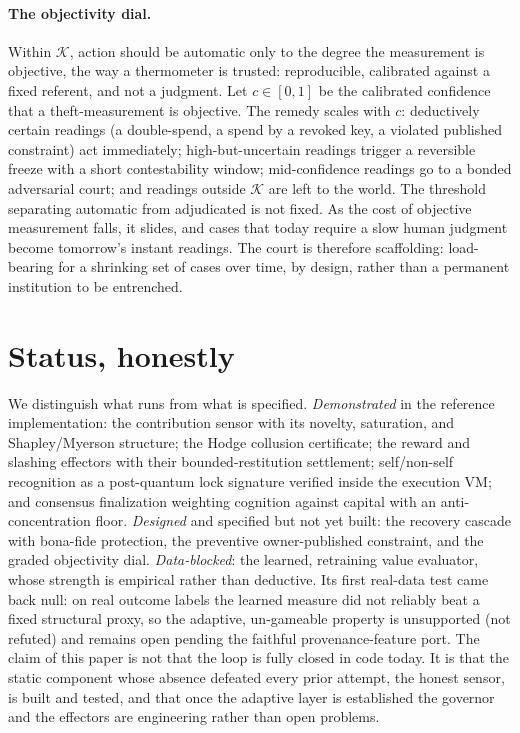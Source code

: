 \documentclass[10pt]{article}
\begin{document}
\paragraph{The objectivity dial.} Within $\mathcal{K}$, action should be automatic only to the degree the
measurement is objective, the way a thermometer is trusted: reproducible, calibrated against a fixed
referent, and not a judgment. Let $c \in [0,1]$ be the calibrated confidence that a theft-measurement is
objective. The remedy scales with $c$: deductively certain readings (a double-spend, a spend by a revoked
key, a violated published constraint) act immediately; high-but-uncertain readings trigger a reversible
freeze with a short contestability window; mid-confidence readings go to a bonded adversarial court; and
readings outside $\mathcal{K}$ are left to the world. The threshold separating automatic from adjudicated
is not fixed. As the cost of objective measurement falls, it slides, and cases that today require a slow
human judgment become tomorrow's instant readings. The court is therefore scaffolding: load-bearing for a
shrinking set of cases over time, by design, rather than a permanent institution to be entrenched.

\section{Status, honestly}

We distinguish what runs from what is specified. \emph{Demonstrated} in the reference implementation: the
contribution sensor with its novelty, saturation, and Shapley/Myerson structure; the Hodge collusion
certificate; the reward and slashing effectors with their bounded-restitution settlement; self/non-self
recognition as a post-quantum lock signature verified inside the execution VM; and consensus finalization
weighting cognition against capital with an anti-concentration floor. \emph{Designed} and specified but
not yet built: the recovery cascade with bona-fide protection, the preventive owner-published constraint,
and the graded objectivity dial. \emph{Data-blocked}: the learned, retraining value evaluator, whose strength is empirical rather than
deductive. Its first real-data test came back null: on real outcome labels the learned measure did not
reliably beat a fixed structural proxy, so the adaptive, un-gameable property is unsupported (not
refuted) and remains open pending the faithful provenance-feature port. The claim of this paper is not
that the loop is fully closed in code today. It is that the static component whose absence defeated
every prior attempt, the honest sensor, is built and tested, and that once the adaptive layer is
established the governor and the effectors are engineering rather than open problems.
\end{document}
